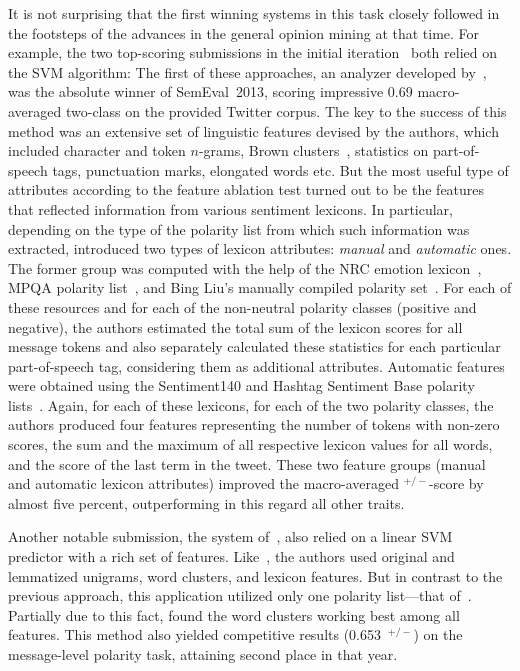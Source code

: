 It is not surprising that the first winning systems in this task
closely followed in the footsteps of the advances in the general
opinion mining at that time.  For example, the two top-scoring
submissions in the initial iteration~\cite{Mohammad:13,Guenther:13}
both relied on the SVM algorithm: The first of these approaches, an
analyzer developed by~\citet{Mohammad:13}, was the absolute winner of
SemEval~2013, scoring impressive 0.69 macro-averaged two-class \F{} on
the provided Twitter corpus.  The key to the success of this method
was an extensive set of linguistic features devised by the authors,
which included character and token $n$-grams, Brown
clusters~\cite{Brown:92}, statistics on part-of-speech tags,
punctuation marks, elongated words etc.  But the most useful type of
attributes according to the feature ablation test turned out to be the
features that reflected information from various sentiment
lexicons. In particular, depending on the type of the polarity list
from which such information was extracted, \citeauthor{Mohammad:13}
introduced two types of lexicon attributes: \emph{manual} and
\emph{automatic} ones.  The former group was computed with the help of
the NRC emotion lexicon~\cite{Mohammad:13a}, MPQA polarity
list~\cite{Wilson:05}, and Bing Liu's manually compiled polarity
set~\cite{Hu:04}.  For each of these resources and for each of the
non-neutral polarity classes (positive and negative), the authors
estimated the total sum of the lexicon scores for all message tokens
and also separately calculated these statistics for each particular
part-of-speech tag, considering them as additional attributes.
Automatic features were obtained using the Sentiment140 and Hashtag
Sentiment Base polarity lists~\cite{Kiritchenko:14}.  Again, for each
of these lexicons, for each of the two polarity classes, the authors
produced four features representing the number of tokens with non-zero
scores, the sum and the maximum of all respective lexicon values for
all words, and the score of the last term in the tweet.  These two
feature groups (manual and automatic lexicon attributes) improved the
macro-averaged \F{}$^{+/-}$-score by almost five percent,
outperforming in this regard all other traits.

Another notable submission, the system of~\citet{Guenther:13}, also
relied on a linear SVM predictor with a rich set of features.
Like~\citet{Mohammad:13}, the authors used original and lemmatized
unigrams, word clusters, and lexicon features.  But in contrast to the
previous approach, this application utilized only one polarity
list---that of~\citet{Esuli:05}.  Partially due to this fact,
\citeauthor{Guenther:13} found the word clusters working best among
all features.  This method also yielded competitive results
(0.653~\F{}$^{+/-}$) on the message-level polarity task, attaining
second place in that year.

